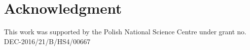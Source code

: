 \documentclass[journal]{IEEEtran}
\begin{document}
\appendix[Algorithms]

%






\section*{Acknowledgment}
This work was supported by the Polish National Science Centre under grant no. DEC-2016/21/B/HS4/00667


\ifCLASSOPTIONcaptionsoff
  \newpage
\fi



\end{document}
